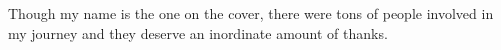 \documentclass[numrefs,sort&compress,review]{nddiss2e}
\begin{document}
\begin{acknowledge}
Though my name is the one on the cover, there were tons of people involved in my journey and they deserve an inordinate amount of thanks.











\end{acknowledge}

\end{document}
